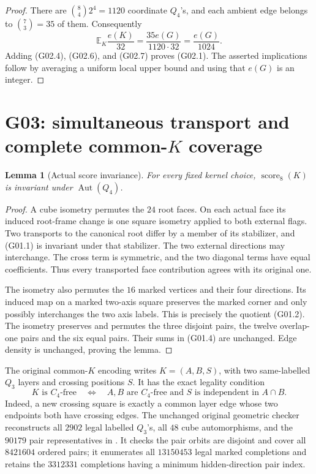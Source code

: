 \documentclass[11pt]{article}
\newtheorem{lemma}[theorem]{Lemma}
\newcommand{\scor}{\operatorname{score}_8}
\newcommand{\Aut}{\operatorname{Aut}}
\newcommand{\E}{\mathbb E}
\newcommand{\file}[1]{\texttt{\detokenize{#1}}}
\begin{document}
\begin{proof}
There are \(\binom84 2^4=1120\) coordinate \(Q_4\)'s, and each ambient
edge belongs to \(\binom73=35\) of them.  Consequently
\[
 \E_K\frac{e(K)}{32}
 =\frac{35e(G)}{1120\cdot32}
 =\frac{e(G)}{1024}.
 \tag{G02.7}
\]
Adding (G02.4), (G02.6), and (G02.7) proves (G02.1).
The asserted implications follow by averaging a uniform local upper
bound and using that \(e(G)\) is an integer.
\end{proof}

\section{G03: simultaneous transport and complete common-\(K\) coverage}

\begin{lemma}[Actual score invariance]\label{lem:symmetry}
For every fixed kernel choice, \(\scor(K)\) is invariant under
\(\Aut(Q_4)\).
\end{lemma}
\begin{proof}
A cube isometry permutes the \(24\) root faces.  On each actual face its
induced root-frame change is one square isometry applied to both external
flags.  Two transports to the canonical root differ by a member of its
stabilizer, and (G01.1) is invariant under that stabilizer.
The two external directions may interchange.  The cross term is
symmetric, and the two diagonal terms have equal coefficients.
Thus every transported face contribution agrees with its original one.

The isometry also permutes the \(16\) marked vertices and their four
directions.  Its induced map on a marked two-axis square preserves the
marked corner and only possibly interchanges the two axis labels.
This is precisely the quotient (G01.2).  The isometry preserves and
permutes the three disjoint pairs, the twelve overlap-one pairs and
the six equal pairs.  Their sums in (G01.4) are unchanged.
Edge density is unchanged, proving the lemma.
\end{proof}

The original common-\(K\) encoding writes \(K=(A,B,S)\), with two
same-labelled \(Q_3\) layers and crossing positions \(S\).  It has the
exact legality condition
\[
 K\text{ is }C_4\text{-free}
 \quad\Longleftrightarrow\quad
 A,B\text{ are }C_4\text{-free and }S
 \text{ is independent in }A\cap B.
 \tag{G03.1}
\]
Indeed, a new crossing square is exactly a common layer edge whose two
endpoints both have crossing edges.
The unchanged original geometric checker reconstructs all \(2902\)
legal labelled \(Q_3\)'s, all \(48\) cube automorphisms, and the
\(90179\) pair representatives in \file{keys.bin}.  It checks the pair
orbits are disjoint and cover all \(8421604\) ordered pairs; it
enumerates all \(13150453\) legal marked completions and retains the
\(3312331\) completions having a minimum hidden-direction pair index.
\end{document}
